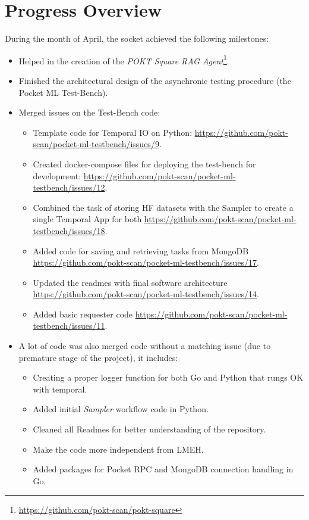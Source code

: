 \section{Progress Overview}\label{sec:a}

During the month of April, the socket achieved the following milestones:

\begin{itemize}
    \item Helped in the creation of the \emph{POKT Square RAG Agent}\footnote{\url{https://github.com/pokt-scan/pokt-square}}.
    \item Finished the architectural design of the asynchronic testing procedure (the Pocket \gls{ML} Test-Bench).
    \item Merged issues on the Test-Bench code:
    \begin{itemize}
        \item Template code for Temporal IO on Python: \url{https://github.com/pokt-scan/pocket-ml-testbench/issues/9}.
        \item Created docker-compose files for deploying the test-bench for development: \url{https://github.com/pokt-scan/pocket-ml-testbench/issues/12}.
        \item Combined the task of storing \gls{HF} datasets with the Sampler to create a single Temporal App for both \url{https://github.com/pokt-scan/pocket-ml-testbench/issues/18}.
        \item Added code for saving and retrieving tasks from MongoDB \url{https://github.com/pokt-scan/pocket-ml-testbench/issues/17}.
        \item Updated the readmes with final software architecture \url{https://github.com/pokt-scan/pocket-ml-testbench/issues/14}.
        \item Added basic requester code \url{https://github.com/pokt-scan/pocket-ml-testbench/issues/11}.
    \end{itemize}
    \item A lot of code was also merged code without a matching issue (due to premature stage of the project), it includes:
    \begin{itemize}
        \item Creating a proper logger function for both Go and Python that rungs OK with temporal.
        \item Added initial \emph{Sampler} workflow code in Python.
        \item Cleaned all Readmes for better understanding of the repository.
        \item Make the code more independent from \gls{LMEH}.
        \item Added packages for Pocket RPC and MongoDB connection handling in Go.
    \end{itemize}
\end{itemize}
